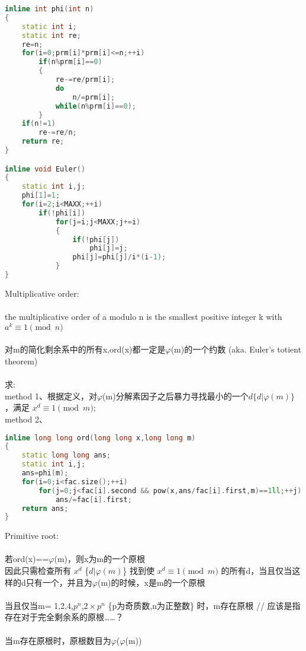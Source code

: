 \begin{lstlisting}[language=C++]
inline int phi(int n)
{
    static int i;
    static int re;
    re=n;
    for(i=0;prm[i]*prm[i]<=n;++i)
        if(n%prm[i]==0)
        {
            re-=re/prm[i];
            do
                n/=prm[i];
            while(n%prm[i]==0);
        }
    if(n!=1)
        re-=re/n;
    return re;
}

inline void Euler()
{
    static int i,j;
    phi[1]=1;
    for(i=2;i<MAXX;++i)
        if(!phi[i])
            for(j=i;j<MAXX;j+=i)
            {
                if(!phi[j])
                    phi[j]=j;
                phi[j]=phi[j]/i*(i-1);
            }
}
\end{lstlisting}
Multiplicative order:\\
\\
the multiplicative order of a modulo n is the smallest positive integer k with\\
     $a^k \equiv 1 \pmod n$ \\
\\
对m的简化剩余系中的所有x,ord(x)都一定是$\varphi$(m)的一个约数 (aka. Euler's totient theorem)\\
\\
求:\\
method 1、根据定义，对$\varphi$(m)分解素因子之后暴力寻找最小的一个$d\{d|\varphi(m)\}$，满足 $x^d \equiv 1 \pmod m$;\\
method 2、\\
\begin{lstlisting}[language=C++]
inline long long ord(long long x,long long m)
{
    static long long ans;
    static int i,j;
    ans=phi(m);
    for(i=0;i<fac.size();++i)
        for(j=0;j<fac[i].second && pow(x,ans/fac[i].first,m)==1ll;++j)
            ans/=fac[i].first;
    return ans;
}
\end{lstlisting}
Primitive root:\\
\\
若ord(x)==$\varphi$(m)，则x为m的一个原根\\
因此只需检查所有 $x^d$ \{$d|\varphi(m)$\} 找到使 $x^d \equiv 1 \pmod m$ 的所有d，当且仅当这样的d只有一个，并且为$\varphi$(m)的时候，x是m的一个原根\\
\\
当且仅当m= 1,2,4,$p^n$,$2\times p^n$ \{p为奇质数,n为正整数\} 时，m存在原根 // 应该是指存在对于完全剩余系的原根……？\\
\\
当m存在原根时，原根数目为$\varphi$($\varphi$(m))\\
